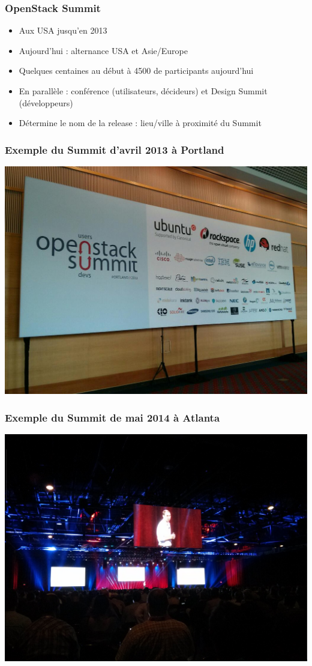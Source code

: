   \begin{frame}
    \frametitle{OpenStack Summit}
    \begin{itemize}
      \item Aux USA jusqu'en 2013
      \item Aujourd'hui : alternance USA et Asie/Europe
      \item Quelques centaines au début à 4500 de participants aujourd'hui
      \item En parallèle : conférence (utilisateurs, décideurs) et Design Summit (développeurs)
      \item Détermine le nom de la release : lieu/ville à proximité du Summit
    \end{itemize}
  \end{frame}

  \begin{frame}
    \frametitle{Exemple du Summit d'avril 2013 à Portland}
    \includegraphics[width=\textwidth]{images/photo-summit.jpg}
  \end{frame}

  \begin{frame}
    \frametitle{Exemple du Summit de mai 2014 à Atlanta}
    \includegraphics[width=\textwidth]{images/photo-summit1.jpg}
  \end{frame}

